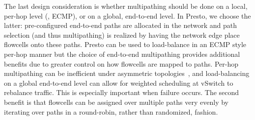 
The last design consideration is whether multipathing should be done on a local, per-hop level (\eg{}, ECMP), or
on a global, end-to-end level. In Presto, we choose the latter: pre-configured end-to-end paths
are allocated in the network and path selection (and thus multipathing) is realized by having the network edge
place flowcells onto these paths. 
Presto can be used to load-balance in an ECMP style per-hop manner but the choice of end-to-end 
multipathing provides additional benefits due to greater control on how flowcells are mapped to
paths. Per-hop multipathing can be inefficient
under asymmetric topologies~\cite{wcmp}, and load-balancing on a global end-to-end level can allow
for weighted scheduling at vSwitch to rebalance traffic. This is especially important when failure occurs.
The second benefit is that flowcells can be assigned over multiple paths very evenly
by iterating over paths in a round-robin, rather than randomized, fashion. 

